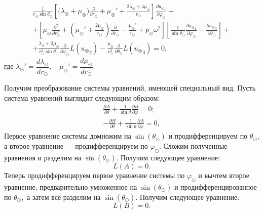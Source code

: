 \begin{equation}\label{eq_3.1}
\begin{split}
\frac{1}{r_\odot\sin\theta_\odot}\left[\biggl(\lambda_\circledcirc+\mu_\circledcirc\biggr)\frac{\partial}{\partial r_\odot} + \mu_\circledcirc' + \frac{2\lambda_\circledcirc+4\mu_\circledcirc}{r_\odot}\right]\frac{\partial {u_\circledcirc}_r}{\partial\varphi_\odot} +\\
+ \left[\mu_\circledcirc\frac{\partial^2}{\partial r_\odot^2} + \left(\mu_\circledcirc'+\frac{2\mu_\circledcirc}{r_\odot}\right)\frac{\partial}{\partial r_\odot} - \frac{\mu_\circledcirc'}{r_\odot} + p_\circledcirc\omega^2\right]\left[\frac{1}{\sin\theta_\odot}\frac{\partial {u_\circledcirc}_2}{\partial\varphi_\odot} - \frac{\partial {u_\circledcirc}_3}{\partial\theta_\odot}\right] +\\
+ \frac{\lambda_\circledcirc+2\mu_\circledcirc}{r_\odot^2\sin\theta_\odot}\frac{\partial}{\partial \varphi_\odot}L({u_\circledcirc}_2) -\frac{\mu_\circledcirc}{r_\odot^2}\frac{\partial}{\partial\theta_\odot}L({u_\circledcirc}_3) = 0,
\end{split}
\end{equation}
где $\lambda_\circledcirc' = \dfrac{ d \!\lambda_\circledcirc}{ d \! r_\odot},\quad\mu_\circledcirc' = \dfrac{ d \!\mu_\circledcirc}{ d \! r_\odot}.$

Получим преобразование системы уравнений, имеющей специальный вид. Пусть система уравнений выглядит следующим образом:
\begin{equation}\label{exaple_system}
\begin{aligned}
\frac{\partial A}{\partial \theta} + \frac{1}{\sin\theta}\frac{\partial B}{\partial\varphi} = 0;\\
- \frac{\partial B}{\partial\theta} + \frac{1}{\sin\theta}\frac{\partial A}{\partial \varphi}  = 0,
\end{aligned}
\end{equation}
Первое уравнение системы домножим на $\sin(\theta_\odot)$ и продифференцируем по $\theta_\odot$, а второе уравнение --- продифференцируем по $\varphi_\odot.$ Сложим полученные уравнения и разделим на $\sin(\theta_\odot)$. Получим следующее уравнение:
\begin{equation*}
L(A) = 0.
\end{equation*}
Теперь продифференцируем первое уравнение системы по $\varphi_\odot$ и вычтем второе уравнение, предварительно умноженное на $\sin(\theta_\odot)$ и продифференцированное по $\theta_\odot,$ а затем всё разделим на $\sin(\theta_\odot).$ Получим следующее уравнение:
\begin{equation*}
L(B) = 0.
\end{equation*}


